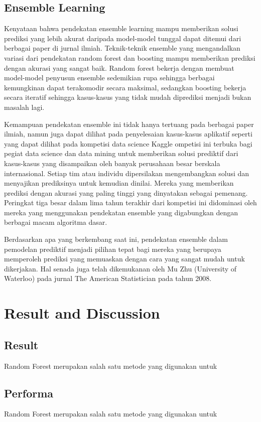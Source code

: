 \documentclass[conference]{IEEEtran}
\begin{document}
\subsection{Ensemble Learning}
Kenyataan bahwa pendekatan ensemble learning mampu memberikan solusi prediksi yang lebih akurat daripada model-model tunggal dapat ditemui dari berbagai paper di jurnal ilmiah.  Teknik-teknik ensemble yang mengandalkan variasi dari pendekatan random forest dan boosting mampu memberikan prediksi dengan akurasi yang sangat baik.  Random forest bekerja dengan membuat model-model penyusun ensemble sedemikian rupa sehingga berbagai kemungkinan dapat terakomodir secara maksimal, sedangkan boosting bekerja secara iteratif sehingga kasus-kasus yang tidak mudah diprediksi menjadi bukan masalah lagi.

Kemampuan pendekatan ensemble ini tidak hanya tertuang pada berbagai paper ilmiah, namun juga dapat dilihat pada penyelesaian kasus-kasus aplikatif seperti yang dapat dilihat pada kompetisi data science Kaggle ompetisi ini terbuka bagi pegiat data science dan data mining untuk memberikan solusi prediktif dari kasus-kasus yang disampaikan oleh banyak perusahaan besar berskala internasional.  Setiap tim atau individu dipersilakan mengembangkan solusi dan menyajikan prediksinya untuk kemudian dinilai.  Mereka yang memberikan prediksi dengan akurasi yang paling tinggi yang dinyatakan sebagai pemenang.  Peringkat tiga besar dalam lima tahun terakhir dari kompetisi ini didominasi oleh mereka yang menggunakan pendekatan ensemble yang digabungkan dengan berbagai macam algoritma dasar.

Berdasarkan apa yang berkembang saat ini, pendekatan ensemble dalam pemodelan prediktif menjadi pilihan tepat bagi mereka yang berupaya memperoleh prediksi yang memuaskan dengan cara yang sangat mudah untuk dikerjakan.  Hal senada juga telah dikemukanan oleh Mu Zhu (University of Waterloo) pada jurnal The American Statistician pada tahun 2008.

\section{Result and Discussion}
\subsection{Result}
Random Forest merupakan salah satu metode yang digunakan untuk

\subsection{Performa}
Random Forest merupakan salah satu metode yang digunakan untuk
\end{document}
